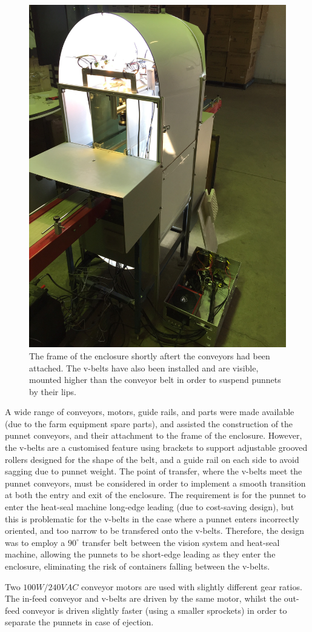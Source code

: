\documentclass[fleqn,twoside]{article}
\begin{document}
\begin{figure}[h]
	\centering
	\includegraphics[width=.4\linewidth]{system_construct_3.jpg}
	\caption{The frame of the enclosure shortly aftert the conveyors had been attached. The v-belts have also been installed and are visible, mounted higher than the conveyor belt in order to suspend punnets by their lips.}
	\label{fig:system_construct_3}
\end{figure}%


A wide range of conveyors, motors, guide rails, and parts were made available (due to the farm equipment spare parts), and assisted the construction of the punnet conveyors, and their attachment to the frame of the enclosure. However, the v-belts are a customised feature using brackets to support adjustable grooved rollers designed for the shape of the belt, and a guide rail on each side to avoid sagging due to punnet weight. The point of transfer, where the v-belts meet the punnet conveyors, must be considered in order to implement a smooth transition at both the entry and exit of the enclosure. The requirement is for the punnet to enter the heat-seal machine long-edge leading (due to cost-saving design), but this is problematic for the v-belts in the case where a  punnet enters incorrectly oriented, and too narrow to be transfered onto the v-belts. Therefore, the design was to employ a $90^{\circ}$ transfer belt between the vision system and heat-seal machine, allowing the punnets to be short-edge leading as they enter the enclosure, eliminating the risk of containers falling between the v-belts. 


Two $100W/240VAC$ conveyor motors are used with slightly different gear ratios. The in-feed conveyor and v-belts are driven by the same motor, whilst the out-feed conveyor is driven slightly faster (using a smaller sprockets) in order to separate the punnets in case of ejection.
\end{document}
